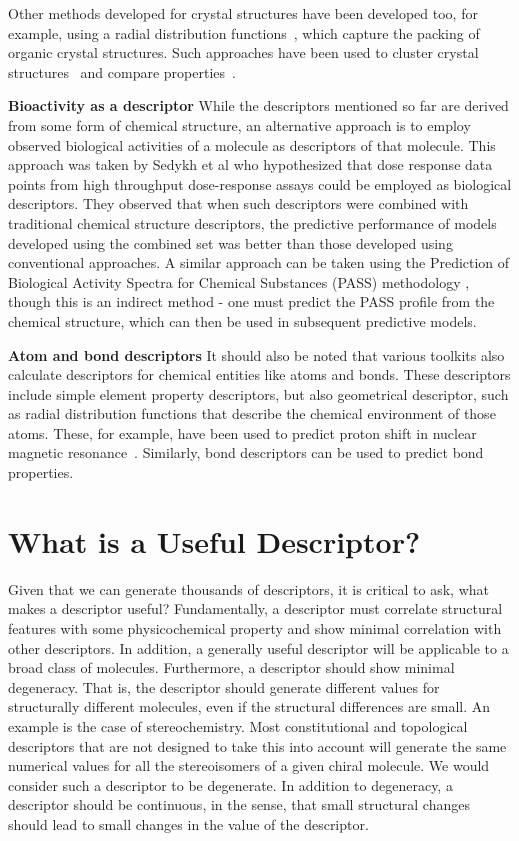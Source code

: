\documentclass[letterpaper, 12pt]{article}
\begin{document}
Other methods developed for crystal structures have been developed
too, for example, using a radial distribution
functions~\cite{Willighagen2005}, which capture the packing of organic
crystal structures. Such approaches have been used to cluster crystal
structures~\cite{Wehrens2006} and compare
properties~\cite{Willighagen2007}.

\textbf{Bioactivity as a descriptor} While the descriptors mentioned
so far are derived from some form of chemical structure, an
alternative approach is to employ observed biological activities of a
molecule as descriptors of that molecule.  This approach was taken by
Sedykh et al \cite{Sedykh:2011fk} who hypothesized that dose response
data points from high throughput dose-response assays could be
employed as biological descriptors. They observed that when such
descriptors were combined with traditional chemical structure
descriptors, the predictive performance of models developed using the
combined set was better than those developed using conventional
approaches. A similar approach can be taken using the Prediction of
Biological Activity Spectra for Chemical Substances (PASS) methodology
\cite{Poroikov:2007aa}, though this is an indirect method - one must
predict the PASS profile from the chemical structure, which can then
be used in subsequent predictive models.

\textbf{Atom and bond descriptors} It should also be noted that various
toolkits also calculate descriptors for chemical entities like atoms and
bonds. These descriptors include simple element property descriptors,
but also geometrical descriptor, such as radial distribution functions
that describe the chemical environment of those atoms. These,
for example, have been used to predict proton shift in 
nuclear magnetic resonance~\cite{AiresDeSousa2002}. Similarly, bond
descriptors can be used to predict bond properties.

\section{What is a Useful Descriptor?}
\label{sec:what-usef-descr}

Given that we can generate thousands of descriptors,  it is critical to ask, what
makes a descriptor useful? Fundamentally, a descriptor must correlate
structural features with some physicochemical property and show
minimal correlation with other descriptors. In addition, a generally
useful descriptor will be applicable to a broad class of
molecules. Furthermore, a descriptor should show minimal
degeneracy. That is, the descriptor should generate different values
for structurally different molecules, even if the structural
differences are small. An example is the case of stereochemistry. Most
constitutional and topological descriptors that are not designed to take this into account will
generate the same numerical values for all the stereoisomers of a
given chiral molecule. We would consider such a descriptor to be
degenerate. In addition to degeneracy, a descriptor should be
continuous, in the sense, that small structural changes should lead to
small changes in the value of the descriptor.
\end{document}
